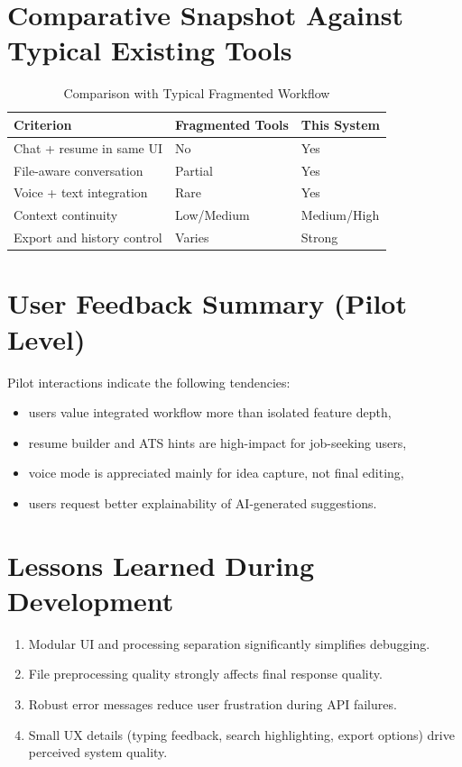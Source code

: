 \documentclass[12pt,a4paper]{report}
\begin{document}
\section{Comparative Snapshot Against Typical Existing Tools}
\begin{table}[H]
\centering
\caption{Comparison with Typical Fragmented Workflow}
\begin{tabular}{|p{1.9in}|p{1.5in}|p{1.5in}|}
\hline
\textbf{Criterion} & \textbf{Fragmented Tools} & \textbf{This System} \\
\hline
Chat + resume in same UI & No & Yes \\
\hline
File-aware conversation & Partial & Yes \\
\hline
Voice + text integration & Rare & Yes \\
\hline
Context continuity & Low/Medium & Medium/High \\
\hline
Export and history control & Varies & Strong \\
\hline
\end{tabular}
\end{table}

\section{User Feedback Summary (Pilot Level)}
Pilot interactions indicate the following tendencies:
\begin{itemize}
  \item users value integrated workflow more than isolated feature depth,
  \item resume builder and ATS hints are high-impact for job-seeking users,
  \item voice mode is appreciated mainly for idea capture, not final editing,
  \item users request better explainability of AI-generated suggestions.
\end{itemize}

\section{Lessons Learned During Development}
\begin{enumerate}
  \item Modular UI and processing separation significantly simplifies debugging.
  \item File preprocessing quality strongly affects final response quality.
  \item Robust error messages reduce user frustration during API failures.
  \item Small UX details (typing feedback, search highlighting, export options) drive perceived system quality.
\end{enumerate}
\end{document}
